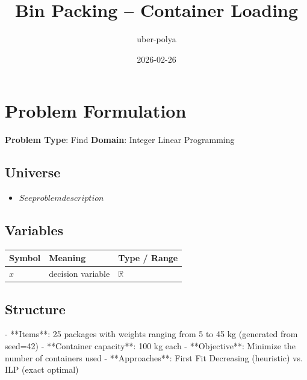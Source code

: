\documentclass[11pt, a4paper]{article}
\title{Bin Packing -- Container Loading}
\author{uber-polya}
\date{2026-02-26}
\begin{document}
\maketitle
\tableofcontents
\newpage

\section{Problem Formulation}

\begin{polyamodel}

\textbf{Problem Type}: Find \hfill
\textbf{Domain}: Integer Linear Programming


\end{polyamodel}

\subsection{Universe}

\begin{itemize}
  \item $See problem description$
\end{itemize}

\subsection{Variables}

\begin{longtable}{lll}
\toprule
\textbf{Symbol} & \textbf{Meaning} & \textbf{Type / Range} \\
\midrule
\endhead
$x$ & decision variable & $\mathbb{{R}}$ \\
\bottomrule
\end{longtable}

\subsection{Structure}

- **Items**: 25 packages with weights ranging from 5 to 45 kg (generated from seed=42)
- **Container capacity**: 100 kg each
- **Objective**: Minimize the number of containers used
- **Approaches**: First Fit Decreasing (heuristic) vs. ILP (exact optimal)
\end{document}
